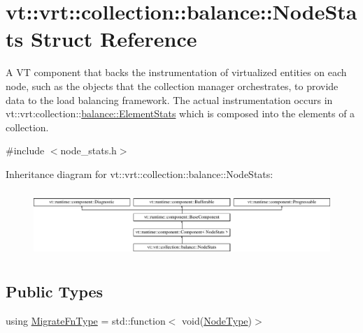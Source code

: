 \hypertarget{structvt_1_1vrt_1_1collection_1_1balance_1_1_node_stats}{}\section{vt\+:\+:vrt\+:\+:collection\+:\+:balance\+:\+:Node\+Stats Struct Reference}
\label{structvt_1_1vrt_1_1collection_1_1balance_1_1_node_stats}


A VT component that backs the instrumentation of virtualized entities on each node, such as the objects that the collection manager orchestrates, to provide data to the load balancing framework. The actual instrumentation occurs in {\ttfamily vt\+::vrt\+:collection\+:}\+:\hyperlink{structvt_1_1vrt_1_1collection_1_1balance_1_1_element_stats}{balance\+::\+Element\+Stats} which is composed into the elements of a collection.  




{\ttfamily \#include $<$node\+\_\+stats.\+h$>$}

Inheritance diagram for vt\+:\+:vrt\+:\+:collection\+:\+:balance\+:\+:Node\+Stats\+:\begin{figure}[H]
\begin{center}
\leavevmode
\includegraphics[height=2.539683cm]{structvt_1_1vrt_1_1collection_1_1balance_1_1_node_stats}
\end{center}
\end{figure}
\subsection*{Public Types}
\begin{DoxyCompactItemize}
\item 
using \hyperlink{structvt_1_1vrt_1_1collection_1_1balance_1_1_node_stats_af702e521887d9015e33a7aedda48d09d}{Migrate\+Fn\+Type} = std\+::function$<$ void(\hyperlink{namespacevt_a866da9d0efc19c0a1ce79e9e492f47e2}{Node\+Type})$>$
\end{DoxyCompactItemize}
